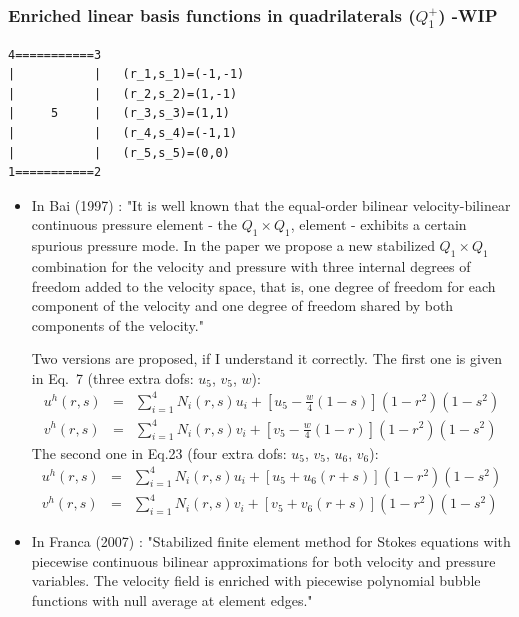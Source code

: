 \subsubsection{Enriched linear basis functions in quadrilaterals ($Q_1^+$) -WIP} \label{ss:quadmini}

\begin{verbatim}
4===========3
|           |   (r_1,s_1)=(-1,-1)
|           |   (r_2,s_2)=(1,-1)
|     5     |   (r_3,s_3)=(1,1)
|           |   (r_4,s_4)=(-1,1)
|           |   (r_5,s_5)=(0,0)
1===========2
\end{verbatim}

\begin{itemize}
\item 
In Bai (1997) \cite{bai97}: "It is well known that the equal-order bilinear velocity-bilinear 
continuous pressure element - the $Q_1\times Q_1$, element - exhibits a certain spurious pressure mode.
In the paper we propose a new stabilized $Q_1\times Q_1$ combination for the velocity and
pressure with three internal degrees of freedom added to the velocity space, that is, one degree of
freedom for each component of the velocity and one degree of freedom shared by both components of
the velocity."

Two versions are proposed, if I understand it correctly.
The first one is given in Eq.~7 (three extra dofs: $u_5$, $v_5$, $w$):
\begin{eqnarray}
u^h(r,s) &=& \sum_{i=1}^4 N_i (r,s) u_i + \left[ u_5 - \frac{w}{4}(1-s) \right] (1-r^2)(1-s^2) \nonumber\\
v^h(r,s) &=& \sum_{i=1}^4 N_i (r,s) v_i + \left[ v_5 - \frac{w}{4}(1-r) \right] (1-r^2)(1-s^2) 
\end{eqnarray}
The second one in Eq.23 (four extra dofs: $u_5$, $v_5$, $u_6$, $v_6$):
\begin{eqnarray}
u^h(r,s) &=& \sum_{i=1}^4 N_i (r,s) u_i + \left[ u_5 +u_6(r+s) \right] (1-r^2)(1-s^2) \nonumber\\
v^h(r,s) &=& \sum_{i=1}^4 N_i (r,s) v_i + \left[ v_5 +v_6(r+s) \right] (1-r^2)(1-s^2) 
\end{eqnarray}

\item In Franca \etal (2007) \cite{fros07}: 
"Stabilized finite element method for Stokes equations with piecewise continuous 
bilinear approximations for both velocity and pressure variables. The velocity
field is enriched with piecewise polynomial bubble functions with null average at element
edges."


\end{itemize}

